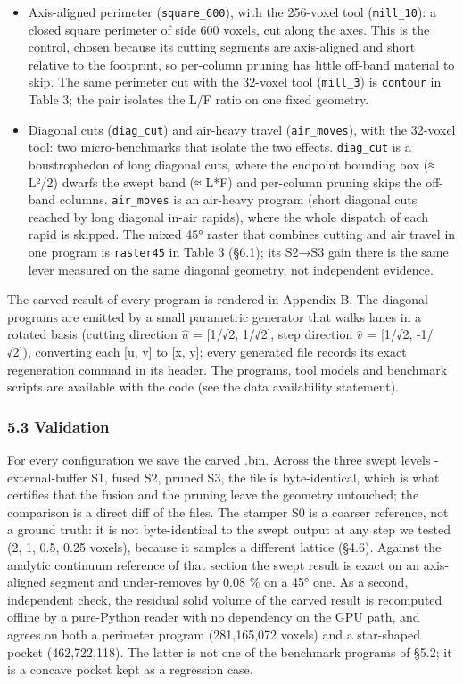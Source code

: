 \documentclass[
]{article}
\begin{document}
\begin{itemize}
\item
  Axis-aligned perimeter (\texttt{square\_600}), with the 256-voxel tool
  (\texttt{mill\_10}): a closed square perimeter of side 600 voxels, cut
  along the axes. This is the control, chosen because its cutting
  segments are axis-aligned and short relative to the footprint, so
  per-column pruning has little off-band material to skip. The same
  perimeter cut with the 32-voxel tool (\texttt{mill\_3}) is
  \texttt{contour} in Table 3; the pair isolates the L/F ratio on one
  fixed geometry.
\item
  Diagonal cuts (\texttt{diag\_cut}) and air-heavy travel
  (\texttt{air\_moves}), with the 32-voxel tool: two micro-benchmarks
  that isolate the two effects. \texttt{diag\_cut} is a boustrophedon of
  long diagonal cuts, where the endpoint bounding box (≈ L²/2) dwarfs
  the swept band (≈ L*F) and per-column pruning skips the off-band
  columns. \texttt{air\_moves} is an air-heavy program (short diagonal
  cuts reached by long diagonal in-air rapids), where the whole dispatch
  of each rapid is skipped. The mixed 45° raster that combines cutting
  and air travel in one program is \texttt{raster45} in Table 3 (§6.1);
  its S2→S3 gain there is the same lever measured on the same diagonal
  geometry, not independent evidence.
\end{itemize}

The carved result of every program is rendered in Appendix B. The
diagonal programs are emitted by a small parametric generator that walks
lanes in a rotated basis (cutting direction \textbf{$\hat{u}$} = {[}1/√2,
1/√2{]}, step direction \textbf{$\hat{v}$} = {[}1/√2, -1/√2{]}), converting each
{[}u, v{]} to {[}x, y{]}; every generated file records its exact
regeneration command in its header. The programs, tool models and
benchmark scripts are available with the code (see the data availability
statement).

\hypertarget{validation}{%
\subsubsection{5.3 Validation}\label{validation}}

For every configuration we save the carved .bin. Across the three swept
levels - external-buffer S1, fused S2, pruned S3, the file is
byte-identical, which is what certifies that the fusion and the pruning
leave the geometry untouched; the comparison is a direct diff of the
files. The stamper S0 is a coarser reference, not a ground truth: it is
not byte-identical to the swept output at any step we tested (2, 1, 0.5,
0.25 voxels), because it samples a different lattice (§4.6). Against the
analytic continuum reference of that section the swept result is exact
on an axis-aligned segment and under-removes by 0.08 \% on a 45° one. As
a second, independent check, the residual solid volume of the carved
result is recomputed offline by a pure-Python reader with no dependency
on the GPU path, and agrees on both a perimeter program (281,165,072
voxels) and a star-shaped pocket (462,722,118). The latter is not one of
the benchmark programs of §5.2; it is a concave pocket kept as a
regression case.
\end{document}
